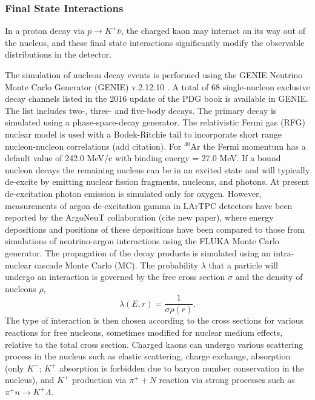 \subsubsection{Final State Interactions}
\label{sec:final-state-interactions}

In a proton decay via $p\rightarrow K^{+} \bar{\nu}$, the charged kaon may interact on its way out of the nucleus, and these final state interactions significantly modify the observable distributions in the detector. 

The simulation of nucleon decay events is performed using the GENIE Neutrino Monte Carlo Generator (GENIE) \cite{genie} v.2.12.10 . A total of 68 single-nucleon exclusive decay channels listed in the 2016 update of the PDG book is available in GENIE. The list includes two-, three- and five-body decays. 
The primary decay is simulated using a phase-space-decay generator. 
The relativistic Fermi gas (RFG) nuclear model is used with a Bodek-Ritchie  tail to incorporate short range nucleon-nucleon correlations (add citation).
For $^{40}$Ar the Fermi momentum has a default value of 242.0 MeV/c with binding energy = 27.0 MeV. 
If a bound nucleon decays the remaining nucleus can be in an excited state and will typically de-excite by emitting nuclear fission fragments, nucleons, and photons. At present de-excitation photon emission is simulated only for oxygen.  However, measurements of argon de-excitation gamma in LArTPC detectors have been reported by the ArgoNeuT collaboration (cite new paper),
where energy depositions and positions of these depositions have been compared to those from simulations of neutrino-argon interactions using the FLUKA Monte Carlo generator. 
The propagation of the decay products is simulated using an intra-nuclear cascade Monte Carlo (MC). The probability $\lambda$ that a particle will undergo an interaction is governed by the free cross section $\sigma$ and the density of nucleons $\rho$,
\begin{equation}
\lambda(E,r)= \frac{1}{\sigma \rho(r)}.
\end{equation}
The type of interaction is then chosen according to the cross sections for various reactions for free nucleons, sometimes modified for nuclear medium effects, relative to the total cross section. Charged kaons can undergo various scattering process in the nucleus such as elastic scattering, charge exchange, absorption (only $K^{-}$; $K^{+}$ absorption is forbidden due to baryon number conservation in the nucleus), and $K^{+}$ production via $\pi^{+}+N$ reaction via strong processes such as $\pi^{+}n \rightarrow K^{+} \Lambda$.

